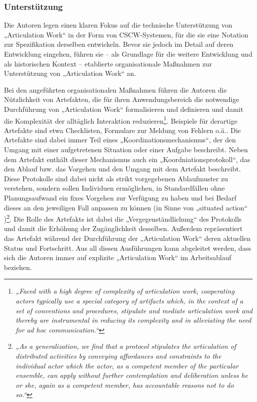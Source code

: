 \subsubsection{Unterstützung}

Die Autoren legen einen klaren Fokus auf die technische Unterstützung von „Articulation Work“ in der Form von \gls{CSCW}-Systemen, für die sie eine Notation zur Spezifikation derselben entwickeln. Bevor sie jedoch im Detail auf deren Entwicklung eingehen, führen sie -- als Grundlage für die weitere Entwicklung und als historischen Kontext -- etablierte organisationale Maßnahmen zur Unterstützung von „Articulation Work“ an.

Bei den angeführten organisationalen Maßnahmen führen die Autoren die Nützlichkeit von Artefakten, die für ihren Anwendungsbereich die notwendige Durchführung von „Articulation Work“ formalisieren und definieren und damit die Komplexität der alltäglich Interaktion reduzieren\footnote{\emph{„Faced with a high degree of complexity of articulation work, cooperating actors typically use a special category of artifacts which, in the context of a set of conventions and procedures, stipulate and mediate articulation work and thereby are instrumental in reducing its complexity and in alleviating the need for ad hoc communication.“}\citep[][S. 159]{Schmidt96}}. Beispiele für derartige Artefakte sind etwa Checklisten, Formulare zur Meldung von Fehlern o.ä.. Die Artefakte sind dabei immer Teil eines „Koordinationsmechanismus“, der den Umgang mit einer aufgetretenen Situation oder einer Aufgabe beschreibt. Neben dem Artefakt enthält dieser Mechanismus auch ein „Koordniationsprotokoll“, das den Ablauf bzw. das Vorgehen und den Umgang mit dem Artefakt beschreibt. Diese Protokolle sind dabei nicht als strikt vorgegebenen Ablaufmuster zu verstehen, sondern sollen Individuen ermöglichen, in Standardfällen ohne Planungsaufwand ein fixes Vorgehen zur Verfügung zu haben und bei Bedarf dieses an den jeweiligen Fall anpassen zu können (in Sinne von „situated action“ \citep{Suchman87})\footnote{\emph{„As a generalization, we find that a protocol stipulates the articulation of distributed activities by conveying affordances and constraints to the individual actor which the actor, as a competent member of the particular ensemble, can apply without further contemplation and deliberation unless he or she, again as a competent member, has accountable reasons not to do so.“}\citep[][S. 173]{Schmidt96}}. Die Rolle des Artefakts ist dabei die „Vergegenständlichung“ des Protokolls und damit die Erhöhung der Zugänglichkeit desselben. Außerdem repräsentiert das Artefakt während der Durchführung der „Articulation Work“ deren aktuellen Status und Fortschritt. Aus all diesen Ausführungen kann abgeleitet werden, dass sich die Autoren immer auf explizite „Articulation Work“ im Arbeitsablauf beziehen.

